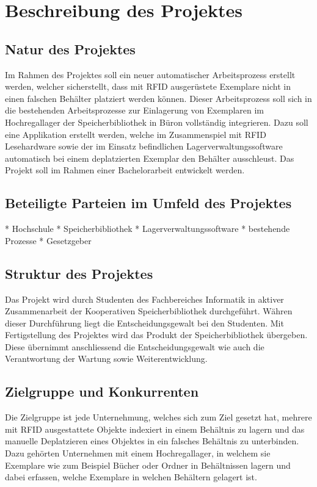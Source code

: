 \chapter{Beschreibung des Projektes}

\section{Natur des Projektes}
Im Rahmen des Projektes soll ein neuer automatischer Arbeitsprozess erstellt werden, welcher sicherstellt, dass mit RFID ausgerüstete Exemplare nicht in einen falschen Behälter platziert werden können. Dieser Arbeitsprozess soll sich in die bestehenden Arbeitsprozesse zur Einlagerung von Exemplaren im Hochregallager der Speicherbibliothek in Büron vollständig integrieren. Dazu soll eine Applikation erstellt werden, welche im Zusammenspiel mit RFID Lesehardware sowie der im Einsatz befindlichen Lagerverwaltungssoftware automatisch bei einem deplatzierten Exemplar den Behälter ausschleust. Das Projekt soll im Rahmen einer Bachelorarbeit entwickelt werden.

\section{Beteiligte Parteien im Umfeld des Projektes}
* Hochschule
* Speicherbibliothek
* Lagerverwaltungssoftware
* bestehende Prozesse
* Gesetzgeber

\section{Struktur des Projektes}
Das Projekt wird durch Studenten des Fachbereiches Informatik in aktiver Zusammenarbeit der Kooperativen Speicherbibliothek durchgeführt. Währen dieser Durchführung liegt die Entscheidungsgewalt bei den Studenten. Mit Fertigstellung des Projektes wird das Produkt der Speicherbibliothek übergeben. Diese übernimmt anschliessend die Entscheidungsgewalt wie auch die Verantwortung der Wartung sowie Weiterentwicklung.

\section{Zielgruppe und Konkurrenten}
Die Zielgruppe ist jede Unternehmung, welches sich zum Ziel gesetzt hat, mehrere mit RFID ausgestattete Objekte indexiert in einem Behältnis zu lagern und das manuelle Deplatzieren eines Objektes in ein falsches Behältnis zu unterbinden.
Dazu gehörten Unternehmen mit einem Hochregallager, in welchem sie Exemplare wie zum Beispiel Bücher oder Ordner in Behältnissen lagern und dabei erfassen, welche Exemplare in welchen Behältern gelagert ist.

